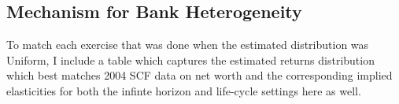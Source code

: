 



\subsection{Mechanism for Bank Heterogeneity}

  \par To match each exercise that was done when the estimated distribution was Uniform, I include a table which captures the estimated returns distribution which best matches 2004 SCF data on net worth and the corresponding implied elasticities for both the infinte horizon and life-cycle settings here as well.  

   